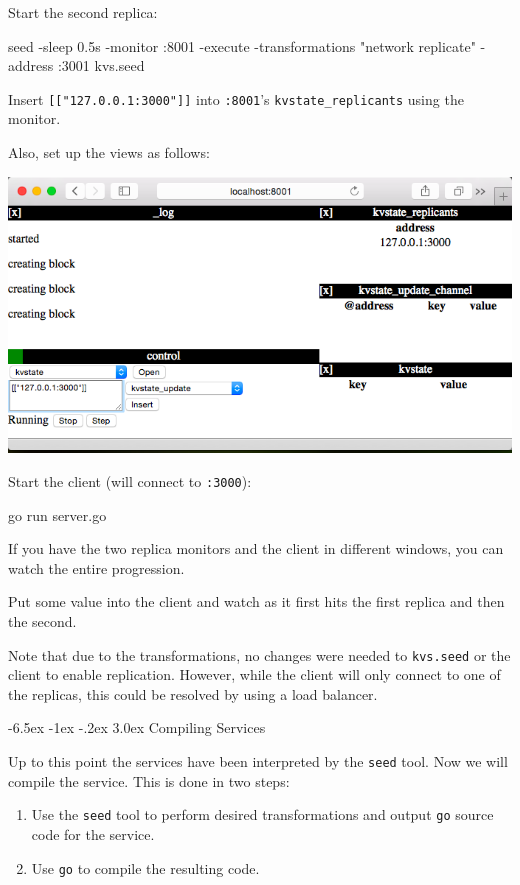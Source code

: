 \documentclass[a5paper,12pt,onecolumn]{article}
\makeatletter
\def\code#1{\mbox{\lstinline{#1}}}
\renewcommand\section{\@startsection {section}{1}{\z@}%
	{-6.5ex \@plus -1ex \@minus -.2ex}%
	{3.0ex}%
	{\sf\Large}}
\makeatother
\begin{document}
Start the second replica:

\begin{cli}
seed -sleep 0.5s -monitor :8001 -execute -transformations "network replicate" -address :3001 kvs.seed
\end{cli}

Insert \code{[["127.0.0.1:3000"]]} into \code{:8001}'s \code{kvstate_replicants} using the monitor.

Also, set up the views as follows:

\includegraphics{replicate/second.png}

Start the client (will connect to \code{:3000}):

\begin{cli}
go run server.go
\end{cli}

If you have the two replica monitors and the client in different windows, you can watch the entire progression.

Put some value into the client and watch as it first hits the first replica and then the second.

Note that due to the transformations, no changes were needed to \code{kvs.seed} or the client to enable replication. However, while the client will only connect to one of the replicas, this could be resolved by using a load balancer.

\section{Compiling Services}

Up to this point the services have been interpreted by the \code{seed} tool. Now we will compile the service. This is done in two steps:

\begin{enumerate}
\item Use the \code{seed} tool to perform desired transformations and output \code{go} source code for the service.
\item Use \code{go} to compile the resulting code.
\end{enumerate}
\end{document}
